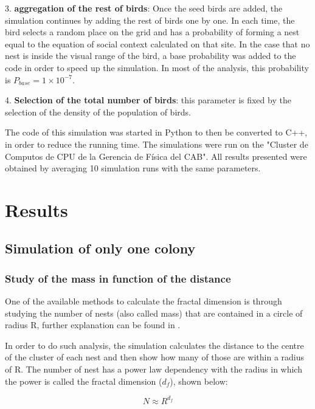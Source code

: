 \documentclass[aps,twocolumn,pre]{revtex4-2}
\begin{document}
3. \textbf{aggregation of the rest of birds}: Once the seed birds are added, the simulation continues by adding the rest of birds one by one. In each time, the bird selects a random place on the grid and has a probability of forming a nest equal to the equation of social context calculated on that site. In the case that no nest is inside the visual range of the bird, a base probability was added to the code in order to speed up the simulation. In most of the analysis, this probability is $P_{base}=1 \times 10^{-7}$.

4. \textbf{Selection of the total number of birds}: this parameter is fixed by the selection of the density of the population of birds.

\vspace{1em}

The code of this simulation was started in Python to then be converted to C++, in order to reduce the running time. The simulations were run on the "Cluster de Computos de CPU de la Gerencia de Física del CAB". All results presented were obtained by averaging 10 simulation runs with the same parameters.

\section{Results}
\subsection{Simulation of only one colony}
\subsubsection{Study of the mass in function of the distance}

One of the available methods to calculate the fractal dimension is through studying the number of nests (also called mass) that are contained in a circle of radius R, further explanation can be found in \cite{Fractales_libro}. 

In order to do such analysis, the simulation calculates the distance to the centre of the cluster of each nest and then show how many of those are within a radius of R. The number of nest has a power law dependency with the radius in which the power is called the fractal dimension ($d_f$), shown below:

\begin{equation}
    N \approx R^ {d_f} 
\label{dimfac}    
\end{equation}
\end{document}
